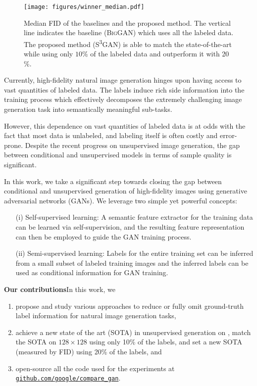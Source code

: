 \documentclass{article}
\newcommand{\tranSSS}{\textsc{S\textsuperscript{3}GAN}}
\newcommand{\biggan}{\textsc{BigGAN}}
\begin{document}
\begin{figure}[t]
\centering
\texttt{[image: figures/winner\_median.pdf]}\vspace{-4mm}
\caption{Median FID of the baselines and the proposed method. The vertical line indicates the baseline (\biggan{}) which uses all the labeled data. The proposed method (\tranSSS) is able to match the state-of-the-art while using only $10\%$ of the labeled data and outperform it with 20$\%$.\vspace{-4mm}}
\end{figure}

Currently, high-fidelity natural image generation hinges upon having access to vast quantities of labeled data. The labels induce rich side information into the training process which effectively decomposes the extremely challenging image generation task into semantically meaningful sub-tasks. 

However, this dependence on vast quantities of labeled data is at odds with the fact that most data is unlabeled, and labeling itself is often costly and error-prone. Despite the recent progress on unsupervised image generation, the gap between conditional and unsupervised models in terms of sample quality is significant. 

In this work, we take a significant step towards closing the gap between conditional and unsupervised generation of high-fidelity images using generative adversarial networks (GANs). We leverage two simple yet powerful concepts:
\begin{enumerate}[itemsep=0pt,topsep=-4pt,parsep=0pt]
\item[(i)] Self-supervised learning: A semantic feature extractor for the training data can be learned via self-supervision, and the resulting feature representation can then be employed to guide the GAN training process.
\item[(ii)] Semi-supervised learning: Labels for the entire training set can be inferred from a small subset of labeled training images and the inferred labels can be used as conditional information for GAN training.
\end{enumerate}

\textbf{Our contributions}\quad In this work, we
\begin{enumerate}[itemsep=0pt,topsep=-5pt,parsep=1pt,leftmargin=5mm]
\item propose and study various approaches to reduce or fully omit ground-truth label information for natural image generation tasks,
\item achieve a new state of the art (SOTA) in unsupervised generation on \imagenet{}, match the SOTA on $128\times128$ \imagenet{} using only 10\% of the labels, and set a new SOTA (measured by FID) using 20\% of the labels, and
\item open-source all the code used for the experiments at \href{https://github.com/google/compare_gan}{\texttt{github.com\slash google\slash compare\_gan}}.
\end{enumerate}
\end{document}
